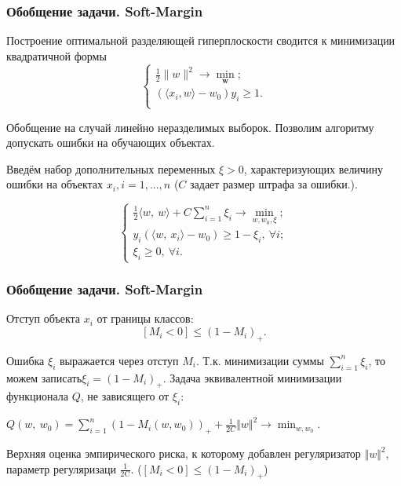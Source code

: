 \documentclass[11pt]{beamer}
\begin{document}
\begin{frame}
	\frametitle{Обобщение задачи. Soft-Margin}
	
	Построение оптимальной разделяющей гиперплоскости сводится к минимизации квадратичной формы
	$$
	\begin{cases}
		\frac{1}{2}\lVert w \rVert^2 \rightarrow \min\limits_{\boldsymbol{w}};\\
		\left(\langle{x}_i,{w}\rangle - w_0\right)y_i \geq 1. \\
	\end{cases}
	$$
	
	Обобщение на случай линейно неразделимых выборок. Позволим алгоритму допускать ошибки на обучающих объектах.
	
	Введём набор дополнительных переменных $\xi > 0$, характеризующих величину ошибки на объектах $x_i, i = 1,... ,n$ ($C$ задает размер штрафа за ошибки.). 
	
	$$ 
	\begin{cases}
		\frac{1}{2}\langle w,\ w\rangle+C\sum_{i=1}^{n}\xi_{i}\rightarrow \underset{w,w_{0},\xi} \min ;\\
		y_{i}(\langle w,\ x_{i}\rangle-w_{0})\geq 1-\xi_{i},\ \forall i;\\
		\xi_{i}\geq 0,\ \forall i.
	\end{cases}
	$$
	

	
\end{frame}

\begin{frame}
	\frametitle{Обобщение задачи. Soft-Margin}
	Отступ объекта $x_i$ от границы классов:
	$$
	[M_{i}<0]\leq(1-M_{i})_{+}.
	$$
	
	Ошибка $\xi_i$ выражается через отступ $M_i$.  Т.к. минимизации суммы $\sum_{i=1}^{n} \xi_i$, то можем записать$\xi_i = (1 - M_i)_+$. Задача эквивалентной минимизации функционала $Q$, не зависящего от $\xi_i$:
	
	\begin{center}
		$Q(w,\displaystyle \ w_{0})=\sum_{i=1}^{n}(1-M_{i}(w, w_{0}))_{+}+\frac{1}{2C}\Vert w\Vert^{2}\rightarrow\min_{w,w_{0}}$.   
	\end{center}

	Верхняя оценка эмпирического риска, к которому добавлен регуляризатор $\Vert w\Vert^{2},$ параметр регуляризаци $\displaystyle \frac{1}{2\mathrm{C}}.$ ($[M_{i}<0]\leq(1-M_{i})_{+}$)
	
	
\end{frame}
\end{document}
